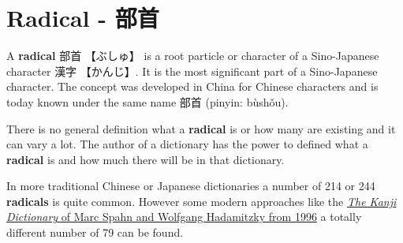 \section{Radical - 部首} \label{sec:Radical}

A \textbf{radical} {部首} {【ぶしゅ】} is a root particle or character of a
Sino-Japanese character {漢字} {【かんじ】}. It is the most significant part of
a Sino-Japanese character. The concept was developed in China for Chinese
characters and is today known under the same name {部首} (pinyin: bùshǒu).

There is no general definition what a \textbf{radical} is or how many are
existing and it can vary a lot. The author of a dictionary has the power to
defined what a \textbf{radical} is and how much there will be in that
dictionary.

In more traditional Chinese or Japanese dictionaries a number of 214 or 244
\textbf{radicals} is quite common. However some modern approaches like the
\Link \href{http://www.hadamitzky.de/english/works_books.htm#KD}{\textit{The
Kanji Dictionary} of Marc Spahn and Wolfgang Hadamitzky from 1996} a totally
different number of 79 can be found.


